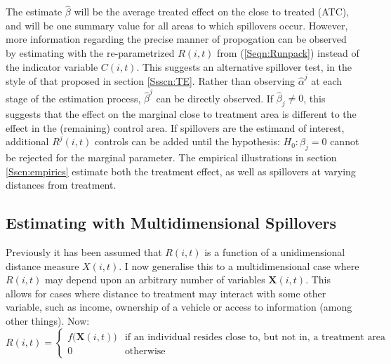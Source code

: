 The estimate $\hat\beta$ will be the average treated effect on the close to 
treated (ATC), and will be one summary value for all areas to which spillovers 
occur. However, more information regarding the precise manner of propogation can 
be observed by estimating with the re-parametrized $R(i,t)$ from 
(\ref{Seqn:Runpack}) instead of the indicator variable $C(i,t)$. This suggests 
an alternative spillover test, in the style of that proposed in section 
\ref{Ssscn:TE}.  Rather than observing $\hat\alpha^j$ at each stage of the 
estimation process, $\hat\beta^j$ can be directly observed. If 
$\hat\beta_j\neq 0$, this suggests that the effect on the marginal close to 
treatment area is different to the effect in the (remaining) control area. If 
spillovers are the estimand of interest, additional $R^j(i,t)$ controls can be 
added until the hypothesis: $H_0: \beta_j = 0$ cannot be rejected for the 
marginal parameter. The empirical illustrations in section \ref{Sscn:empirics} 
estimate both the treatment effect, as well as spillovers at varying distances 
from treatment.

\subsection{Estimating with Multidimensional Spillovers}
\label{Ssscn:multi}
Previously it has been assumed that $R(i,t)$ is a function of a unidimensional 
distance measure $X(i,t)$. I now generalise this to a multidimensional case 
where $R(i,t)$ may depend upon an arbitrary number of variables 
$\mathbf{X}(i,t)$. This allows for cases where distance to treatment may 
interact with some other variable, such as income, ownership of a vehicle or
access to information (among other things). Now:
\begin{equation}
\nonumber
 R(i,t) =
  \begin{cases}
   f\Big(\mathbf{X}(i,t)\Big)   & \text{if an individual resides close to, but not in, a treatment area} \\
   0                            & \text{otherwise} 
  \end{cases}
\end{equation}

